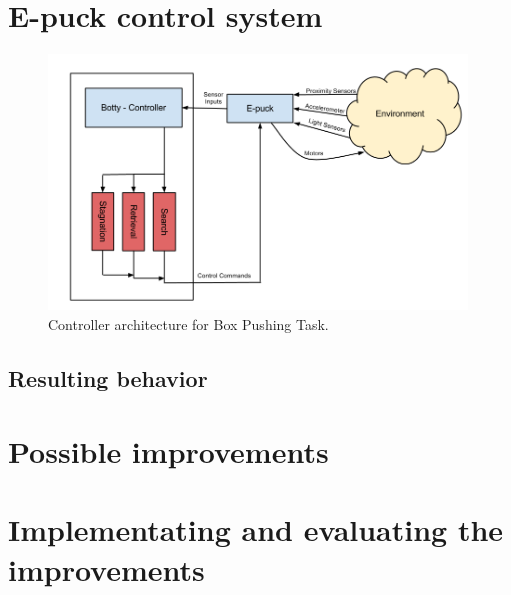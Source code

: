 \documentclass[a4paper,10pt]{article}
\begin{document}
\section{E-puck control system}
\label{sec:a2}

\begin{figure}
  \centering
  \includegraphics[width=0.99\textwidth]{models/SubSym Proj 4 architecture.png}
  \caption{Controller architecture for Box Pushing Task.}
  \label{fig:architecture}
\end{figure}

\subsection{Resulting behavior}

\section{Possible improvements}
\label{sec:b1}

\section{Implementating and evaluating the improvements}
\label{sec:b2}
\end{document}
